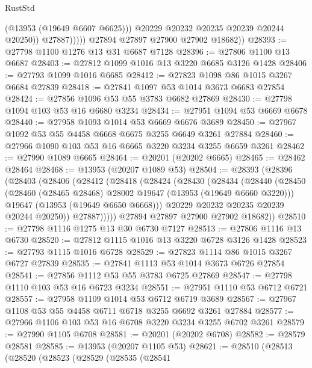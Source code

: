 \begin{lexlean}{RustStd}
\begin{coremodule}
                        (@13953 (@19649 @6607 @6625)))
                      @20229
                      @20232
                      @20235
                      @20239
                      @20244
                      @20250))
                  @27887)))))
        @27894
        @27897
        @27900
        @27902
        @18682))
@28393 := @27798 @1100 @1276 @13 @31 @6687 @7128
@28396 := @27806 @1100 @13 @6687
@28403 := @27812 @1099 @1016 @13 @3220 @6685 @3126 @1428
@28406 := @27793 @1099 @1016 @6685
@28412 := @27823 @1098 @86 @1015 @3267 @6684 @27839
@28418 := @27841 @1097 @53 @1014 @3673 @6683 @27854
@28424 := @27856 @1096 @53 @55 @3783 @6682 @27869
@28430 := @27798 @1094 @103 @53 @16 @6680 @3234
@28434 := @27951 @1094 @53 @6669 @6678
@28440 := @27958 @1093 @1014 @53 @6669 @6676 @3689
@28450 := @27967 @1092 @53 @55 @4458 @6668 @6675 @3255 @6649 @3261 @27884
@28460 := @27966 @1090 @103 @53 @16 @6665 @3220 @3234 @3255 @6659 @3261
@28462 := @27990 @1089 @6665
@28464 := @20201 (@20202 @6665)
@28465 := @28462 @28464
@28468 := @13953 (@20207 @1089 @53)
@28504 := @28393
    (@28396
      (@28403
        (@28406
          (@28412
            (@28418
              (@28424
                (@28430
                  (@28434
                    (@28440
                      (@28450
                        (@28460 (@28465 @28468) @28002 @19647 (@13953 (@19649 @6660 @3220)))
                        @19647
                        (@13953 (@19649 @6650 @6668)))
                      @20229
                      @20232
                      @20235
                      @20239
                      @20244
                      @20250))
                  @27887)))))
        @27894
        @27897
        @27900
        @27902
        @18682))
@28510 := @27798 @1116 @1275 @13 @30 @6730 @7127
@28513 := @27806 @1116 @13 @6730
@28520 := @27812 @1115 @1016 @13 @3220 @6728 @3126 @1428
@28523 := @27793 @1115 @1016 @6728
@28529 := @27823 @1114 @86 @1015 @3267 @6727 @27839
@28535 := @27841 @1113 @53 @1014 @3673 @6726 @27854
@28541 := @27856 @1112 @53 @55 @3783 @6725 @27869
@28547 := @27798 @1110 @103 @53 @16 @6723 @3234
@28551 := @27951 @1110 @53 @6712 @6721
@28557 := @27958 @1109 @1014 @53 @6712 @6719 @3689
@28567 := @27967 @1108 @53 @55 @4458 @6711 @6718 @3255 @6692 @3261 @27884
@28577 := @27966 @1106 @103 @53 @16 @6708 @3220 @3234 @3255 @6702 @3261
@28579 := @27990 @1105 @6708
@28581 := @20201 (@20202 @6708)
@28582 := @28579 @28581
@28585 := @13953 (@20207 @1105 @53)
@28621 := @28510
    (@28513
      (@28520
        (@28523
          (@28529
            (@28535
              (@28541

\end{coremodule}
\end{lexlean}
